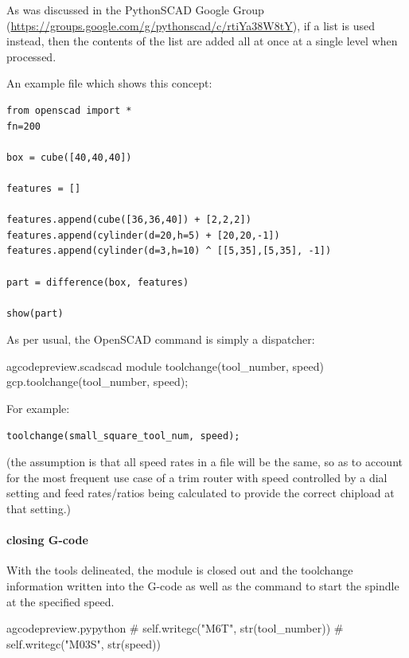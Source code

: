\documentclass{ltxdoc}
\begin{document}
As was discussed in the PythonSCAD Google Group (\url{https://groups.google.com/g/pythonscad/c/rtiYa38W8tY}), if a list is used instead, then the contents of the list are added all at once at a single level when processed.

An example file which shows this concept:

\begin{verbatim}
from openscad import *
fn=200

box = cube([40,40,40])

features = []

features.append(cube([36,36,40]) + [2,2,2])
features.append(cylinder(d=20,h=5) + [20,20,-1])
features.append(cylinder(d=3,h=10) ^ [[5,35],[5,35], -1])

part = difference(box, features)

show(part)

\end{verbatim}

As per usual, the OpenSCAD command is simply a dispatcher:

\lstset{firstnumber=\thegcpscad}
\begin{writecode}{a}{gcodepreview.scad}{scad}
module toolchange(tool_number, speed){
    gcp.toolchange(tool_number, speed);
}

\end{writecode}
\addtocounter{gcpscad}{4}

\noindent For example:

\begin{verbatim}
toolchange(small_square_tool_num, speed);
\end{verbatim}

\noindent (the assumption is that all speed rates in a file will be the same, so as to account for the most frequent use case of a trim router with speed controlled by a dial setting and feed rates/ratios being calculated to provide the correct chipload at that setting.)

\paragraph{closing G-code}

With the tools delineated, the module is closed out and the toolchange information written into the G-code as well as the command to start the spindle at the specified speed.
 
\lstset{firstnumber=\thegcpy}
\begin{writecode}{a}{gcodepreview.py}{python}
#        self.writegc("M6T", str(tool_number))
#        self.writegc("M03S", str(speed))

\end{writecode}
\addtocounter{gcpy}{3}
\end{document}
